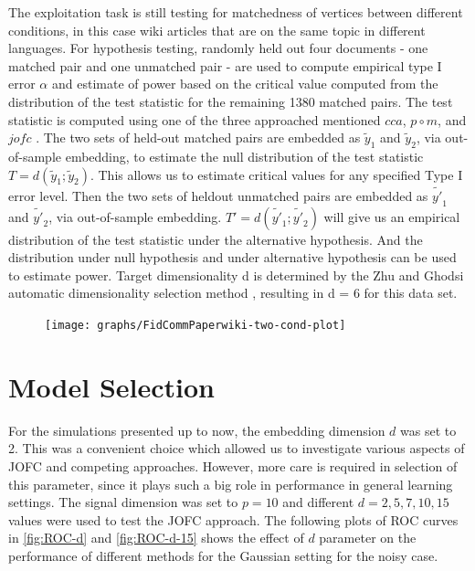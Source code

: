 \documentclass[12pt,oneside,final]{thesis}\usepackage[]{graphicx}\usepackage[]{color}
\begin{document}
The exploitation task is still testing for matchedness of vertices between different conditions, in this case wiki articles that are on the same topic  in  different languages.
For hypothesis testing,   randomly held out four documents - one matched pair and one unmatched pair
 -  are used to compute empirical type I error $\alpha$ and estimate of power based on the critical value computed
  from the distribution of the test statistic for the remaining 1380 matched pairs. 
The test statistic is computed using one of the three approached mentioned  $cca$, $p\circ m$, and $jofc$ . 
The two sets of held-out matched pairs are embedded as $\tilde{y}_1$ and $\tilde{y}_2$, via out-of-sample
embedding, to estimate the null distribution of the test statistic $T = d(\tilde{y}_1; \tilde{y}_2)$. This allows
us to estimate critical values for any specified Type I error level. 
Then the two sets of heldout unmatched pairs are embedded as $\tilde{y'}_1$ and $\tilde{y'}_2$, via out-of-sample embedding. 
$T' = d(\tilde{y'}_1; \tilde{y'}_2)$ will give us an empirical distribution of the test statistic  under the alternative hypothesis. 
And the distribution under null hypothesis and under alternative hypothesis can be used to estimate power.
Target dimensionality d is determined by the Zhu and Ghodsi  automatic dimensionality selection
method \cite{ZhuGhodsi}, resulting in d = 6 for this data set.


\begin{figure}
 \centering
\texttt{[image: graphs/FidCommPaperwiki-two-cond-plot]} 
\end{figure}



\section{Model Selection}
For the simulations presented up to now, the embedding dimension $d$ was set to 2. This was a convenient choice which allowed us to investigate various aspects of JOFC and competing approaches.
However,  more care is required in selection of this parameter, since it plays such a big role in performance in general learning settings. The signal dimension was set to $p=10$ and different $d=2,5,7,10,15$ values were used to test the JOFC approach.
The following plots of ROC curves in    \ref{fig:ROC-d} and  \ref{fig:ROC-d-15} shows the effect of $d$ parameter on the performance of different methods for the Gaussian setting for the noisy case.
\end{document}
